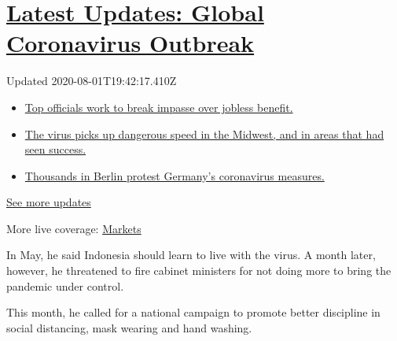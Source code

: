 \hypertarget{latest-updates-global-coronavirus-outbreak}{%
\section{\texorpdfstring{\href{https://www.nytimes3xbfgragh.onion/2020/08/01/world/coronavirus-covid-19.html?action=click\&pgtype=Article\&state=default\&region=MAIN_CONTENT_1\&context=storylines_live_updates}{Latest
Updates: Global Coronavirus
Outbreak}}{Latest Updates: Global Coronavirus Outbreak}}\label{latest-updates-global-coronavirus-outbreak}}

Updated 2020-08-01T19:42:17.410Z

\begin{itemize}
\tightlist
\item
  \href{https://www.nytimes3xbfgragh.onion/2020/08/01/world/coronavirus-covid-19.html?action=click\&pgtype=Article\&state=default\&region=MAIN_CONTENT_1\&context=storylines_live_updates\#link-3ac56579}{Top
  officials work to break impasse over jobless benefit.}
\item
  \href{https://www.nytimes3xbfgragh.onion/2020/08/01/world/coronavirus-covid-19.html?action=click\&pgtype=Article\&state=default\&region=MAIN_CONTENT_1\&context=storylines_live_updates\#link-8796723}{The
  virus picks up dangerous speed in the Midwest, and in areas that had
  seen success.}
\item
  \href{https://www.nytimes3xbfgragh.onion/2020/08/01/world/coronavirus-covid-19.html?action=click\&pgtype=Article\&state=default\&region=MAIN_CONTENT_1\&context=storylines_live_updates\#link-25930521}{Thousands
  in Berlin protest Germany's coronavirus measures.}
\end{itemize}

\href{https://www.nytimes3xbfgragh.onion/2020/08/01/world/coronavirus-covid-19.html?action=click\&pgtype=Article\&state=default\&region=MAIN_CONTENT_1\&context=storylines_live_updates}{See
more updates}

More live coverage:
\href{https://www.nytimes3xbfgragh.onion/live/2020/07/31/business/stock-market-today-coronavirus?action=click\&pgtype=Article\&state=default\&region=MAIN_CONTENT_1\&context=storylines_live_updates}{Markets}

In May, he said Indonesia should learn to live with the virus. A month
later, however, he threatened to fire cabinet ministers for not doing
more to bring the pandemic under control.

This month, he called for a national campaign to promote better
discipline in social distancing, mask wearing and hand washing.

